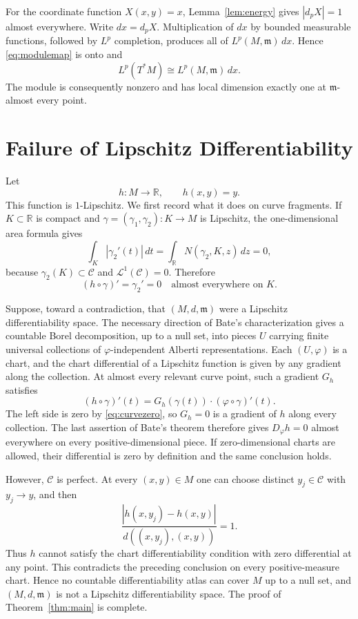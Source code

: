 \documentclass[11pt]{article}
\newcommand{\R}{\mathbb R}
\newcommand{\Ccal}{\mathcal C}
\newcommand{\m}{\mathfrak m}
\begin{document}
For the coordinate function $X(x,y)=x$, Lemma~\ref{lem:energy} gives
$|d_pX|=1$ almost everywhere.  Write $dx=d_pX$.  Multiplication of $dx$ by
bounded measurable functions, followed by $L^p$ completion, produces all of
$L^p(M,\m)\,dx$.  Hence \eqref{eq:modulemap} is onto and
\[
                    L^p(T^*M)\cong L^p(M,\m)\,dx.
\]
The module is consequently nonzero and has local dimension exactly one at
$\m$-almost every point.

\section*{Failure of Lipschitz Differentiability}

Let
\[
                         h:M\to\R,\qquad h(x,y)=y.
\]
This function is $1$-Lipschitz.  We first record what it does on curve
fragments.  If $K\subset\R$ is compact and
$\gamma=(\gamma_1,\gamma_2):K\to M$ is Lipschitz, the one-dimensional area
formula gives
\[
 \int_K|\gamma_2'(t)|\,dt
 =\int_{\R}N(\gamma_2,K,z)\,dz=0,
\]
because $\gamma_2(K)\subset\Ccal$ and $\mathcal L^1(\Ccal)=0$.  Therefore
\begin{equation}\label{eq:curvezero}
                         (h\circ\gamma)'=\gamma_2'=0
                         \quad\text{almost everywhere on }K.
\end{equation}

Suppose, toward a contradiction, that $(M,d,\m)$ were a Lipschitz
differentiability space.  The necessary direction of Bate's characterization
\cite[Theorem 7.8]{Bate} gives a countable Borel decomposition, up to a null
set, into pieces $U$ carrying finite universal collections of
$\varphi$-independent Alberti representations.  Each $(U,\varphi)$ is a
chart, and the chart differential of a Lipschitz function is given by any
gradient along the collection.  At almost every relevant curve point, such
a gradient $G_h$ satisfies
\begin{equation}\label{eq:chain}
 (h\circ\gamma)'(t)
 =G_h(\gamma(t))\cdot(\varphi\circ\gamma)'(t).
\end{equation}
The left side is zero by \eqref{eq:curvezero}, so $G_h=0$ is a gradient of
$h$ along every collection.  The last assertion of Bate's theorem therefore
gives $D_\varphi h=0$ almost everywhere on every positive-dimensional piece.
If zero-dimensional charts are allowed, their differential is zero by
definition and the same conclusion holds.

However, $\Ccal$ is perfect.  At every $(x,y)\in M$ one can choose distinct
$y_j\in\Ccal$ with $y_j\to y$, and then
\begin{equation}\label{eq:vertical}
 \frac{|h(x,y_j)-h(x,y)|}{d((x,y_j),(x,y))}=1.
\end{equation}
Thus $h$ cannot satisfy the chart differentiability condition with zero
differential at any point.  This contradicts the preceding conclusion on
every positive-measure chart.  Hence no countable differentiability atlas
can cover $M$ up to a null set, and $(M,d,\m)$ is not a Lipschitz
differentiability space.  The proof of Theorem~\ref{thm:main} is complete.
\end{document}
